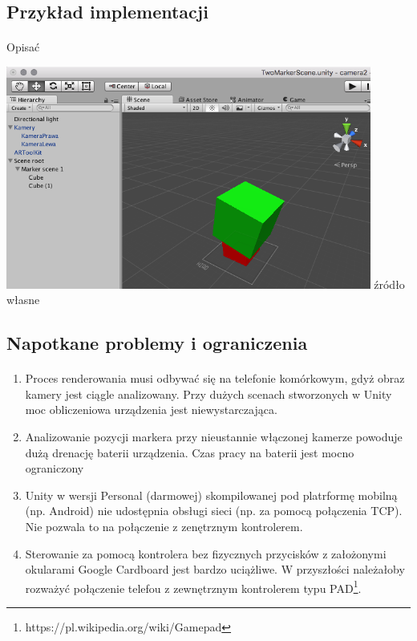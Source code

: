 \subsection{Przykład implementacji}
\paragraph{}
{\color{red}Opisać}
\begin{center}
\includegraphics[width=0.9\textwidth]{images/artoolkit-przyklad.png}
\small {źródło własne}
\end{center}
\subsection{Napotkane problemy i ograniczenia}
\paragraph{}
\begin{enumerate}
	\item Proces renderowania musi odbywać się na telefonie komórkowym, gdyż obraz kamery jest ciągle analizowany. Przy dużych scenach stworzonych w Unity moc obliczeniowa urządzenia jest niewystarczająca.
	\item Analizowanie pozycji markera przy nieustannie włączonej kamerze powoduje dużą drenację baterii urządzenia. Czas pracy na baterii jest mocno ograniczony
	\item Unity w wersji Personal (darmowej) skompilowanej pod platrformę mobilną (np. Android) nie udostępnia obsługi sieci (np. za pomocą połączenia TCP). Nie pozwala to na połączenie z zenętrznym kontrolerem.
	\item Sterowanie za pomocą kontrolera bez fizycznych przycisków z założonymi okularami Google Cardboard jest bardzo uciążliwe. W przyszłości należałoby rozważyć połączenie telefou z zewnętrznym kontrolerem typu PAD\footnote{https://pl.wikipedia.org/wiki/Gamepad}.
\end{enumerate}